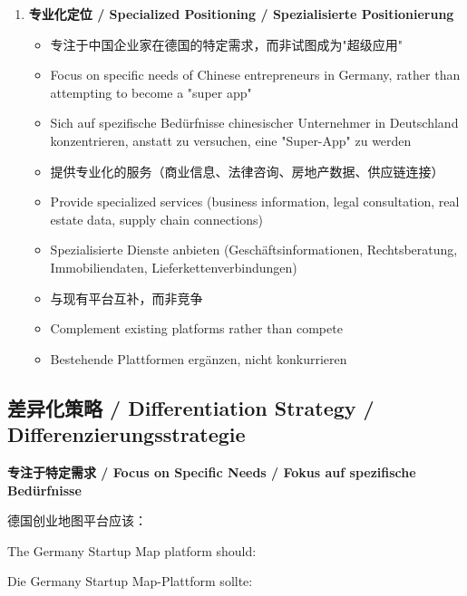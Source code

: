 \documentclass[11pt,a4paper]{article}
\begin{document}
\begin{enumerate}
    \item \textbf{专业化定位 / Specialized Positioning / Spezialisierte Positionierung}
    \begin{itemize}
        \item 专注于中国企业家在德国的特定需求，而非试图成为"超级应用"
        \item Focus on specific needs of Chinese entrepreneurs in Germany, rather than attempting to become a "super app"
        \item Sich auf spezifische Bedürfnisse chinesischer Unternehmer in Deutschland konzentrieren, anstatt zu versuchen, eine "Super-App" zu werden
        \item 提供专业化的服务（商业信息、法律咨询、房地产数据、供应链连接）
        \item Provide specialized services (business information, legal consultation, real estate data, supply chain connections)
        \item Spezialisierte Dienste anbieten (Geschäftsinformationen, Rechtsberatung, Immobiliendaten, Lieferkettenverbindungen)
        \item 与现有平台互补，而非竞争
        \item Complement existing platforms rather than compete
        \item Bestehende Plattformen ergänzen, nicht konkurrieren
    \end{itemize}
\end{enumerate}

\subsection{差异化策略 / Differentiation Strategy / Differenzierungsstrategie}

\textbf{专注于特定需求 / Focus on Specific Needs / Fokus auf spezifische Bedürfnisse}

德国创业地图平台应该：

The Germany Startup Map platform should:

Die Germany Startup Map-Plattform sollte:
\end{document}
